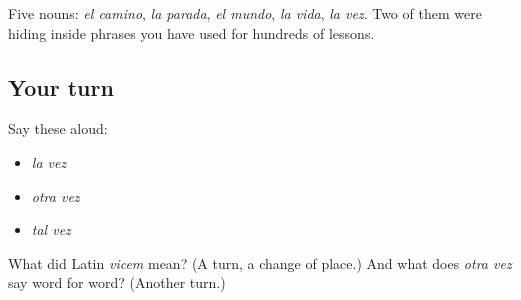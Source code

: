 \begin{grammarlens}[title={What you've built}]
Five nouns: \emph{el camino}, \emph{la parada}, \emph{el mundo}, \emph{la vida}, \emph{la vez}. Two of them were hiding inside phrases you have used for hundreds of lessons.
\end{grammarlens}

\subsection*{Your turn}
Say these aloud:

\begin{itemize}
\raggedright
  \item \emph{la vez}
  \item \emph{otra vez}
  \item \emph{tal vez}
\end{itemize}

\begin{tcolorbox}[breakable,colback=teal!4,colframe=teal!35!black,title={Before you move on}]
What did Latin \emph{vicem} mean? (A turn, a change of place.) And what does \emph{otra vez} say word for word? (Another turn.)
\end{tcolorbox}
